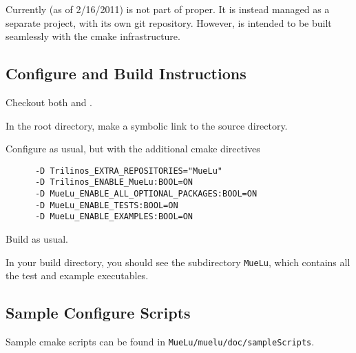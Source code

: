 Currently (as of 2/16/2011) \muelu is not part of \trilinos proper.  It is instead managed as a separate project,
with its own git repository.  However, \muelu is intended to be built seamlessly with the \trilinos cmake
infrastructure.

\subsection{Configure and Build Instructions}

\be
  \item Checkout both \trilinos and \muelu.
  \item In the \trilinos root directory, make a symbolic link to the \muelu source directory.
  \item Configure \trilinos as usual, but with the additional cmake directives\\
    \begin{verbatim}
      -D Trilinos_EXTRA_REPOSITORIES="MueLu"
      -D Trilinos_ENABLE_MueLu:BOOL=ON
      -D MueLu_ENABLE_ALL_OPTIONAL_PACKAGES:BOOL=ON
      -D MueLu_ENABLE_TESTS:BOOL=ON
      -D MueLu_ENABLE_EXAMPLES:BOOL=ON
    \end{verbatim}
  \item Build \trilinos as usual.
  \item In your build directory, you should see the subdirectory \verb!MueLu!, which contains all the test and
  example executables.
\ee

\subsection{Sample Configure Scripts}

Sample cmake scripts can be found in \verb!MueLu/muelu/doc/sampleScripts!.
